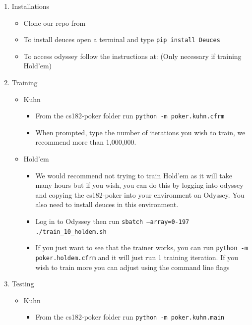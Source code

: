 \documentclass[11pt]{article}
\begin{document}
\begin{enumerate}
\item Installations 
	\begin{itemize}
    	\item Clone our repo from 
    	\item To install deuces open a terminal and type \texttt{pip install Deuces}
    	\item To access odyssey follow the instructions at:  (Only necessary if training Hold'em)
    \end{itemize}
\item Training
	\begin{itemize}
         \item Kuhn
         	\begin{itemize}
         		\item From the cs182-poker folder run \texttt{python -m poker.kuhn.cfrm}
                \item When prompted, type the number of iterations you wish to train, we recommend more than 1,000,000.
         	\end{itemize}
            \item Hold'em
    	\begin{itemize}
            \item We would recommend not trying to train Hold'em as it will take many hours but if you wish, you can do this by logging into odyssey and copying the cs182-poker into your environment on Odyssey. You also need to install deuces in this environment.
            \item Log in to Odyssey then run \texttt{sbatch --array=0-197 ./train\_10\_holdem.sh}
            \item If you just want to see that the trainer works, you can run \texttt{python -m poker.holdem.cfrm} and it will just run 1 training iteration. If you wish to train more you can adjust using the command line flags
         \end{itemize}
    \end{itemize}
\item Testing
	\begin{itemize}
    	\item Kuhn
    	\begin{itemize}
            \item From the cs182-poker folder run \texttt{python -m poker.kuhn.main}

\end{itemize}
\end{itemize}
\end{enumerate}
\end{document}
